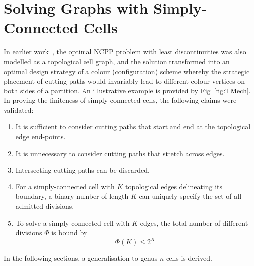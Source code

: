 \documentclass[journal]{IEEEtran}
\begin{document}


\section{Solving Graphs with Simply-Connected Cells}
\label{section_simply_connected}
In earlier work~\cite{Yang2020Cellular}, the optimal NCPP problem with least discontinuities was also modelled as a 
topological cell graph, and the solution transformed into an optimal design strategy of a colour (configuration) scheme whereby the strategic placement of cutting paths would invariably 
lead to different colour vertices on both sides of a partition. An illustrative example is provided by Fig~\ref{fig:TMech}. 
In proving the finiteness of simply-connected cells, the following claims were validated:
\begin{enumerate}
\item It is sufficient to consider cutting paths that start and end at the topological edge end-points. 
\item It is unnecessary to consider cutting paths that stretch across edges.
\item Intersecting cutting paths can be discarded. 
\item For a simply-connected cell with $K$ topological edges delineating its boundary, a binary number of length $K$ 
can uniquely specify the set of all admitted divisions. 
\item To solve a simply-connected cell with $K$ edges, the total number of different divisions $\Phi$  is bound by %
\begin{equation}
\label{equ_Psi}
\Phi(K) \leq 2^K
\end{equation}
\end{enumerate}
In the following sections, a generalisation to genus-$n$ cells is derived.
\end{document}
